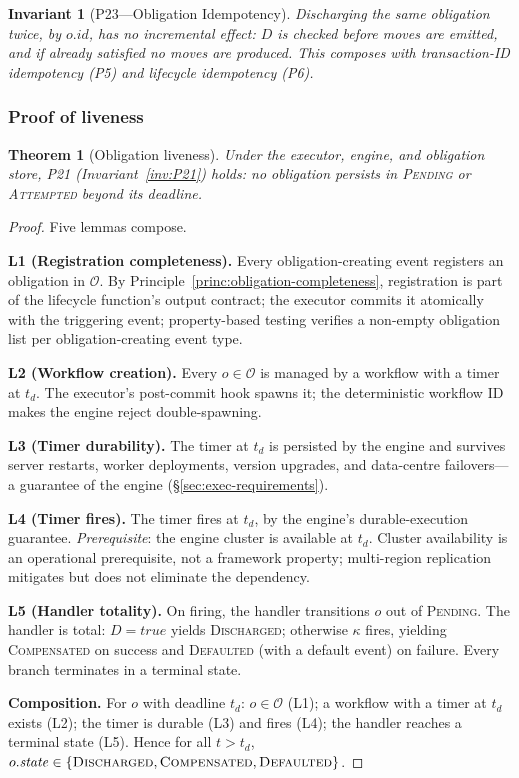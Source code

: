 \documentclass[11pt,a4paper]{article}
\newtheorem{theorem}[definition]{Theorem}
\newtheorem{invariant}[definition]{Invariant}
\begin{document}
\begin{invariant}[P23---Obligation Idempotency]
\label{inv:P23}\label{inv:obligation-idempotency}
Discharging the same obligation twice, by $o.\mathit{id}$, has no incremental effect: $D$ is checked before moves are emitted, and if already satisfied no moves are produced. This composes with transaction-ID idempotency (P5) and lifecycle idempotency (P6).
\end{invariant}

\subsubsection{Proof of liveness}
\label{sec:liveness-proof}

\begin{theorem}[Obligation liveness]
\label{thm:obligation-liveness}
Under the executor, engine, and obligation store, P21 (Invariant~\ref{inv:P21}) holds: no obligation persists in \textsc{Pending} or \textsc{Attempted} beyond its deadline.
\end{theorem}

\begin{proof}
Five lemmas compose.

\textbf{L1 (Registration completeness).} Every obligation-creating event registers an obligation in $\mathcal{O}$. By Principle~\ref{princ:obligation-completeness}, registration is part of the lifecycle function's output contract; the executor commits it atomically with the triggering event; property-based testing verifies a non-empty obligation list per obligation-creating event type.

\textbf{L2 (Workflow creation).} Every $o \in \mathcal{O}$ is managed by a workflow with a timer at $t_d$. The executor's post-commit hook spawns it; the deterministic workflow ID makes the engine reject double-spawning.

\textbf{L3 (Timer durability).} The timer at $t_d$ is persisted by the engine and survives server restarts, worker deployments, version upgrades, and data-centre failovers---a guarantee of the engine (\S\ref{sec:exec-requirements}).

\textbf{L4 (Timer fires).} The timer fires at $t_d$, by the engine's durable-execution guarantee. \textit{Prerequisite}: the engine cluster is available at $t_d$. Cluster availability is an operational prerequisite, not a framework property; multi-region replication mitigates but does not eliminate the dependency.

\textbf{L5 (Handler totality).} On firing, the handler transitions $o$ out of \textsc{Pending}. The handler is total: $D = \mathit{true}$ yields \textsc{Discharged}; otherwise $\kappa$ fires, yielding \textsc{Compensated} on success and \textsc{Defaulted} (with a default event) on failure. Every branch terminates in a terminal state.

\textbf{Composition.} For $o$ with deadline $t_d$: $o \in \mathcal{O}$ (L1); a workflow with a timer at $t_d$ exists (L2); the timer is durable (L3) and fires (L4); the handler reaches a terminal state (L5). Hence for all $t > t_d$, $o.\mathit{state} \in \{\textsc{Discharged}, \textsc{Compensated}, \textsc{Defaulted}\}$.
\end{proof}
\end{document}

